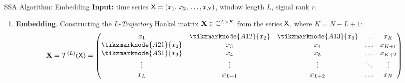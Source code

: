 \documentclass[pdf, unicode, ucs, notheorems]{beamer}
\theoremstyle{definition}
\begin{document}
\begin{frame}{SSA Algorithm: Embedding}
  \textbf{Input:} time series $\mathsf{X} = (x_1,\, x_2,\, \ldots, x_N)$,
  window length $L$, signal rank $r$.
  \vspace{0.4cm}\\
  \begin{enumerate}
    \item \textbf{Embedding}.
      Constructing the $L$-\emph{Trajectory} Hankel matrix $\mathbf{X}\in
      \mathbb{C}^{L \times K}$ from the series $\mathsf{X}$, where $K = N - L + 1$:\\
      \[
        \bfX = \calT^{(L)}(\tX) =
        \begin{pmatrix}
          x_1                     & \tikzmarknode{A12}{x_2} &
          \tikzmarknode{A13}{x_3} & \ldots & x_K     \\
          \tikzmarknode{A21}{x_2} & x_3                     & x_4
          & \ldots & x_{K+1} \\
          \tikzmarknode{A31}{x_3} & x_4                     & x_5
          & \ldots & x_{K+2} \\
          \vdots                  & \vdots                  & \vdots
          & \ddots & \vdots  \\
          x_L                     & x_{L+1}                 & x_{L+2}
          & \ldots & x_N
        \end{pmatrix}
      \]
  \end{enumerate}
\end{frame}
\end{document}
